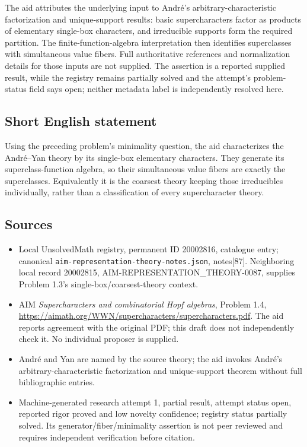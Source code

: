 \documentclass[11pt]{article}
\begin{document}
The aid attributes the underlying input to Andr\'e's arbitrary-characteristic factorization and unique-support results: basic supercharacters factor as products of elementary single-box characters, and irreducible supports form the required partition. The finite-function-algebra interpretation then identifies superclasses with simultaneous value fibers. Full authoritative references and normalization details for those inputs are not supplied. The assertion is a reported supplied result, while the registry remains partially solved and the attempt's problem-status field says open; neither metadata label is independently resolved here.
\subsection{Short English statement}
Using the preceding problem's minimality question, the aid characterizes the Andr\'e–Yan theory by its single-box elementary characters. They generate its superclass-function algebra, so their simultaneous value fibers are exactly the superclasses. Equivalently it is the coarsest theory keeping those irreducibles individually, rather than a classification of every supercharacter theory.
\subsection{Sources}
\begin{itemize}
\item Local UnsolvedMath registry, permanent ID 20002816, catalogue entry; canonical \texttt{aim-representation-theory-notes.json}, notes[87]. Neighboring local record 20002815, AIM-REPRESENTATION\_THEORY-0087, supplies Problem 1.3's single-box/coarsest-theory context.
\item AIM \emph{Supercharacters and combinatorial Hopf algebras}, Problem 1.4, \url{https://aimath.org/WWN/supercharacters/supercharacters.pdf}. The aid reports agreement with the original PDF; this draft does not independently check it. No individual proposer is supplied.
\item Andr\'e and Yan are named by the source theory; the aid invokes Andr\'e's arbitrary-characteristic factorization and unique-support theorem without full bibliographic entries.
\item Machine-generated research attempt 1, partial result, attempt status open, reported rigor proved and low novelty confidence; registry status partially solved. Its generator/fiber/minimality assertion is not peer reviewed and requires independent verification before citation.
\end{itemize}
\end{document}
